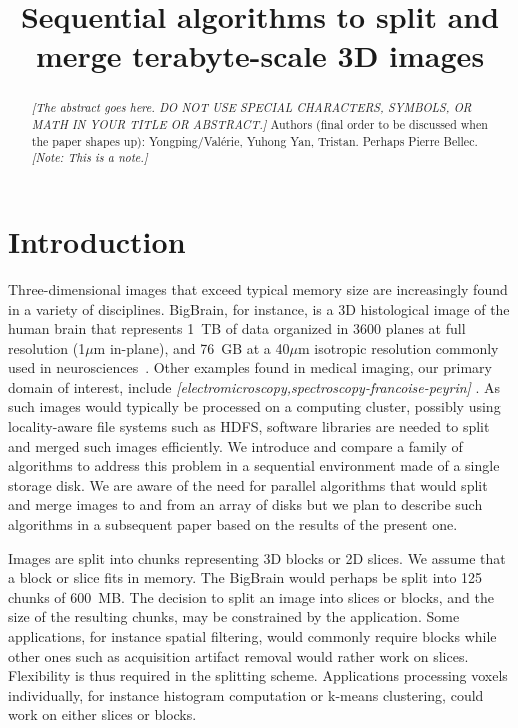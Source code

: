 \documentclass[10pt, conference, compsocconf]{IEEEtran}
\newcommand{\todo}[1]{
  \color{red}\emph{[#1]}
  \color{black}
}
\newcommand{\note}[1]{
  \color{blue}\emph{[Note: #1]}
  \color{black}
}
\begin{document}
\title{Sequential algorithms to split and merge terabyte-scale 3D images}

\maketitle

\begin{abstract}
  \todo{The abstract goes here. DO NOT USE SPECIAL CHARACTERS,
    SYMBOLS, OR MATH IN YOUR TITLE OR ABSTRACT.}  Authors (final order
  to be discussed when the paper shapes up): Yongping/Val\'erie,
  Yuhong Yan, Tristan. Perhaps Pierre Bellec. \note{This is a note.}
\end{abstract}


\section{Introduction}

Three-dimensional images that exceed typical memory size are
increasingly found in a variety of disciplines. BigBrain, for
instance, is a 3D histological image of the human brain that
represents 1~TB of data organized in 3600 planes at full resolution
(1$\mu$m in-plane), and 76~GB at a 40$\mu$m isotropic resolution
commonly used in neurosciences~\cite{amunts2013bigbrain}. Other
examples found in medical imaging, our primary domain of interest,
include \todo{electromicroscopy,spectroscopy-francoise-peyrin}. As
such images would typically be processed on a computing cluster,
possibly using locality-aware file systems such as HDFS, software
libraries are needed to split and merged such images efficiently. We
introduce and compare a family of algorithms to address this problem
in a sequential environment made of a single storage disk. We are
aware of the need for parallel algorithms that would split and merge
images to and from an array of disks but we plan to describe such
algorithms in a subsequent paper based on the results of the present
one.



Images are split into chunks representing 3D blocks or 2D slices. We
assume that a block or slice fits in memory. The BigBrain would
perhaps be split into 125 chunks of 600~MB. The decision to split an
image into slices or blocks, and the size of the resulting chunks, may
be constrained by the application. Some applications, for instance
spatial filtering, would commonly require blocks while other ones such
as acquisition artifact removal would rather work on
slices. Flexibility is thus required in the splitting
scheme. Applications processing voxels individually, for instance
histogram computation or k-means clustering, could work on either
slices or blocks.
\end{document}
